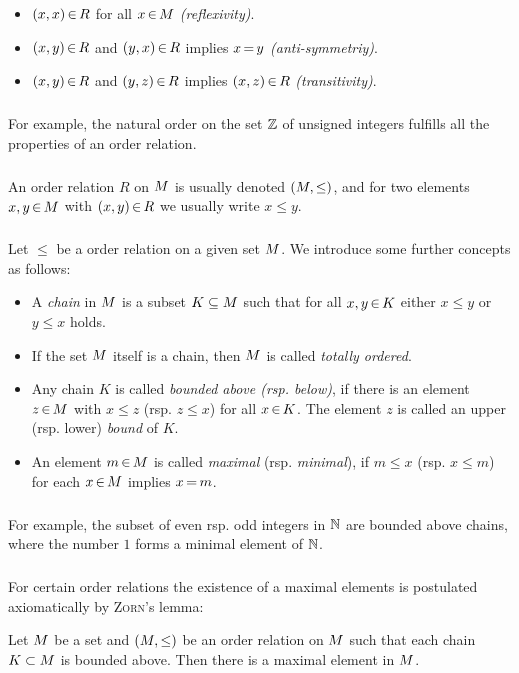 \documentclass[11pt,twoside]{article}
\begin{document}
\begin{itemize}[leftmargin=15mm]
\item[1.]
$(x,x) {\,\in\,} R$ for all $x {\,\in\,} M$ \textit{(reflexivity)}.
\item[2.]
$(x,y) {\,\in\,} R$ and $(y,x) {\,\in\,} R$ implies $x {\,=\,} y$
\textit{(anti-symmetriy)}.
\item[3.]
$(x,y) {\,\in\,} R$ and $(y,z) {\,\in\,} R$ implies $(x,z) {\,\in\,} R$
\textit{(transitivity)}.
\end{itemize}

\subparagraph{}
For example,
the natural order on the set ${\mathbb{Z}}$ of unsigned integers
fulfills all the properties of an order relation.

\subparagraph{}
An order relation $R$ on $M$ is usually denoted $(M,\leq)$,
and for two elements $x,y {\,\in\,} M$ with $(x,y) {\,\in\,} R$
we usually write $x \leq y$.

\subparagraph{}
Let $\leq$ be a order relation on a given set $M$.
We introduce some further concepts as follows:

\begin{itemize}[leftmargin=15pt]
\item[1.]
A \textit{chain} in $M$ is a subset $K \subseteq M$
such that for all $x,y {\,\in\,} K$ either $x \leq y$ or $y \leq x$ holds.
\item[2.]
If the set $M$ itself is a chain,
then $M$ is called \textit{totally ordered}.
\item[3.]
Any chain $K$ is called \textit{bounded above (rsp. below)},
if there is an element $z {\,\in\,} M$ with $x \leq z$ (rsp. $z \leq x$)
for all $x {\,\in\,} K$.
The element $z$ is called an upper (rsp. lower) \textit{bound} of $K$.
\item[4.]
An element $m {\,\in\,} M$ is called \textit{maximal}
(rsp. \textit{minimal}),
if $m \leq x$ (rsp. $x \leq m$) for each $x {\,\in\,} M$ implies $x {\,=\,} m$.
\end{itemize}

\subparagraph{}
For example,
the subset of even rsp. odd integers in ${\mathbb{N}}$ are bounded above chains,
where the number $1$ forms a minimal element of ${\mathbb{N}}$.

\subparagraph{}
For certain order relations the existence of a maximal elements
is postulated axiomatically by \textsc{Zorn}'s lemma:

\begin{theorem}
Let $M$ be a set and $(M,\leq)$ be an order relation on $M$
such that each chain $K \subset M$ is bounded above.
Then there is a maximal element in $M$.
\end{theorem}
\end{document}
